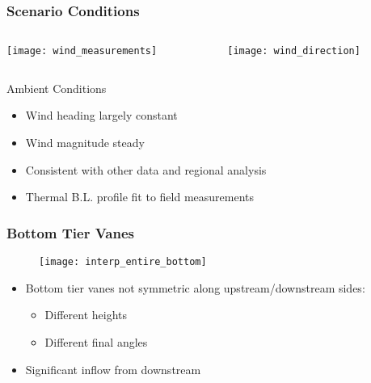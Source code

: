 \documentclass[mathserif]{beamer}
\begin{document}
%
%
%
\begin{frame}
\frametitle{Scenario Conditions}
 
 \begin{columns}[]
  \begin{column}{0.5\linewidth}

   \begin{center}
    \texttt{[image: wind\_measurements]}
   \end{center}

  \end{column}
  \begin{column}{0.5\linewidth}
 
   \begin{center}
    \texttt{[image: wind\_direction]}
   \end{center}
  
  \end{column}
\end{columns}


  \begin{block}{Ambient Conditions}
  \begin{itemize}
   \item Wind heading largely constant 
   \item Wind magnitude steady 
   \item Consistent with other data and regional analysis
   \item Thermal B.L. profile fit to field measurements
  \end{itemize}
  \end{block}	

\end{frame}



%
%
%
\begin{frame}
 \frametitle{Bottom Tier Vanes}
    \begin{figure}[htb]
     \centering
     \texttt{[image: interp\_entire\_bottom]}
    \end{figure}
 
 \begin{block}{}
  \begin{itemize}
   \item Bottom tier vanes not symmetric along upstream/downstream
	 sides:
	 \begin{itemize}
	  \item Different heights
	  \item Different final angles
	 \end{itemize}
   \item Significant inflow from downstream
  \end{itemize}
 \end{block}
\end{frame}
\end{document}
